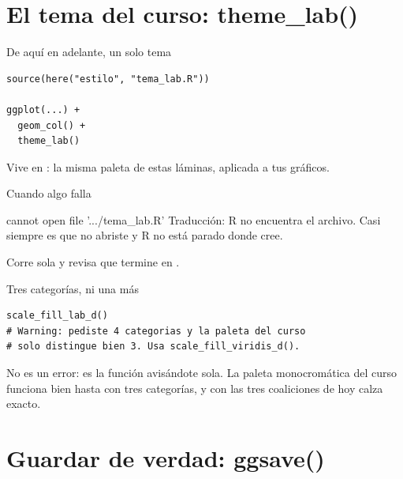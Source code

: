 \section{El tema del curso: theme\_lab()}

\begin{frame}[fragile]{De aquí en adelante, un solo tema}
\begin{lstlisting}
source(here("estilo", "tema_lab.R"))

ggplot(...) +
  geom_col() +
  theme_lab()
\end{lstlisting}

  \vspace{0.6em}
  Vive en : la misma paleta de estas láminas,
  aplicada a tus gráficos.
\end{frame}

\begin{frame}{Cuando algo falla}
  \vspace{0.4em}
  \begin{errorbox}{cannot open file '.../tema\_lab.R'}
    Traducción: R no encuentra el archivo. Casi siempre es que no
    abriste  y R no está parado donde cree.

    \vspace{0.5em}
    Corre  sola y revisa que termine en
    .
  \end{errorbox}
\end{frame}

\begin{frame}[fragile]{Tres categorías, ni una más}
\begin{lstlisting}
scale_fill_lab_d()
# Warning: pediste 4 categorias y la paleta del curso
# solo distingue bien 3. Usa scale_fill_viridis_d().
\end{lstlisting}

  \vspace{0.7em}
  No es un error: es la función avisándote sola. La paleta monocromática
  del curso funciona bien hasta con tres categorías, y con las tres
  coaliciones de hoy calza exacto.
\end{frame}

\section{Guardar de verdad: ggsave()}

